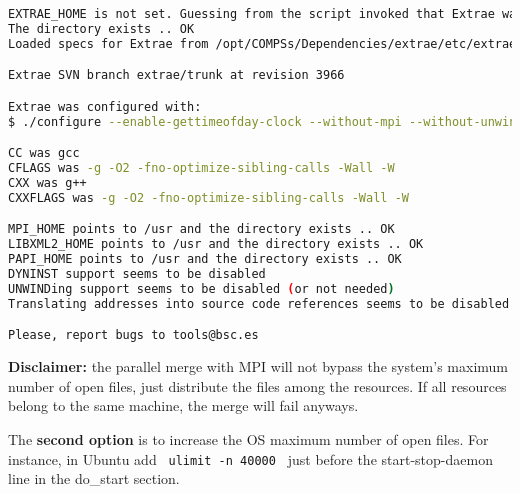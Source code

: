 \begin{lstlisting}[language=bash]
EXTRAE_HOME is not set. Guessing from the script invoked that Extrae was installed in /opt/COMPSs/Dependencies/extrae
The directory exists .. OK
Loaded specs for Extrae from /opt/COMPSs/Dependencies/extrae/etc/extrae-vars.sh

Extrae SVN branch extrae/trunk at revision 3966

Extrae was configured with:
$ ./configure --enable-gettimeofday-clock --without-mpi --without-unwind --without-dyninst --without-binutils --with-mpi=/usr --enable-parallel-merge --with-papi=/usr --with-java-jdk=/usr/lib/jvm/java-7-openjdk-amd64/ --disable-openmp --disable-nanos --disable-smpss --prefix=/opt/COMPSs/Dependencies/extrae --with-mpi=/usr --enable-parallel-merge --libdir=/opt/COMPSs/Dependencies/extrae/lib

CC was gcc
CFLAGS was -g -O2 -fno-optimize-sibling-calls -Wall -W
CXX was g++
CXXFLAGS was -g -O2 -fno-optimize-sibling-calls -Wall -W

MPI_HOME points to /usr and the directory exists .. OK
LIBXML2_HOME points to /usr and the directory exists .. OK
PAPI_HOME points to /usr and the directory exists .. OK
DYNINST support seems to be disabled
UNWINDing support seems to be disabled (or not needed)
Translating addresses into source code references seems to be disabled (or not needed)

Please, report bugs to tools@bsc.es
\end{lstlisting}

\textbf{Disclaimer:} the parallel merge with MPI will not bypass the system's maximum number of open files, just distribute the
files among the resources. If all resources belong to the same machine, the merge will fail anyways.

\hfill

The \textbf{second option} is to increase the OS maximum number of open files. For instance, in Ubuntu add \texttt{ ulimit -n 40000 } just before
the start-stop-daemon line in the do\_start section.
